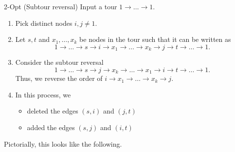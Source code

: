 \begin{general}{2-Opt (Subtour reversal)}{}
Input a tour $1 \to \dots \to 1$. 
\begin{enumerate}
\item Pick distinct nodes $i,j \neq 1$.
\item Let $s,t$ and $x_1, \dots, x_k$ be nodes in the tour such that it can be written as 
$$
1 \to \dots \to s \to i \to x_1 \to \dots \to x_k  \to j \to t \to \dots \to 1.
$$
\item Consider the subtour reversal
$$
1 \to \dots \to s \to j \to x_k \to \dots \to x_1  \to i \to t \to \dots \to 1.
$$
Thus, we reverse the order of $ i \to x_1 \to \dots \to x_k \to j$.  
\item In this process, we 
\begin{itemize}
\item deleted the edges $(s,i)$ and $(j,t)$
\item added the edges $(s,j)$ and $(i,t)$
\end{itemize}
\end{enumerate}
\end{general}
Pictorially, this looks like the following.

